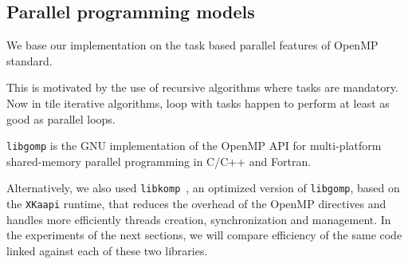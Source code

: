 \documentclass{article}
\newcommand{\libkomp}{\texttt{libkomp}\xspace}
\newcommand{\libgomp}{\texttt{libgomp}\xspace}
\newcommand{\xkaapi}{\texttt{XKaapi}\xspace}
\begin{document}
 
 
 
 
 
 

 
\subsection{Parallel programming models}

We base our implementation on the task based parallel features of OpenMP
standard.
 
This is motivated by the use of recursive algorithms where tasks are
mandatory. Now in tile iterative algorithms, loop with tasks happen to perform
at least as good as parallel loops.
 
 

 
 
 
 
 
 
 
 
 
 
 
 
 
 
 
 
 

\libgomp is the GNU implementation of the OpenMP API for multi-platform
shared-memory parallel programming in C/C++ and Fortran. 
 
 
 
Alternatively, we also used
\libkomp~\cite{BGD12}, an optimized version of \libgomp, based on the \xkaapi runtime,
that reduces the overhead of the OpenMP directives and handles more
efficiently threads creation, synchronization and management.
In the experiments of the next sections, we will compare efficiency of the same
code linked against each of these two libraries. 

 
 
 
 
 
 
 
 
 
 
 
 
 
 
 

 
 
 
 
 
 
 
 


 
 
 

 
 
 
 
 
 
\end{document}
